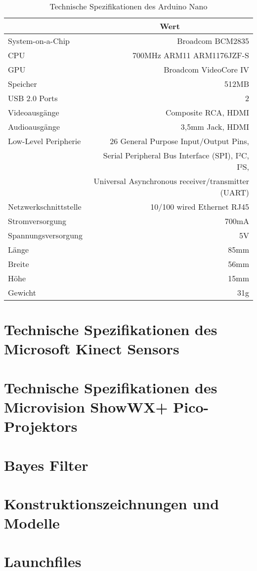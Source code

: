 \begin{table}[ht]
\caption{Technische Spezifikationen des Arduino Nano}
\begin{center}
\begin{tabular}{|l|r|}
\hline
\rowcolor{lightgray} \multicolumn{1}{|c|}{\textbf{Spezifikation}} & \multicolumn{1}{|c|}{\textbf{Wert}}\\
\hline
System-on-a-Chip & Broadcom BCM2835\\
\hline
CPU & 700MHz ARM11 ARM1176JZF-S\\
\hline
GPU & Broadcom VideoCore IV\\
\hline
Speicher & 512MB\\
\hline
USB 2.0 Ports & 2\\
\hline
Videoausgänge & Composite RCA, HDMI\\
\hline
Audioausgänge & 3,5mm Jack, HDMI\\
\hline
Low-Level Peripherie & 26 General Purpose Input/Output Pins,\\
& Serial Peripheral Bus Interface (SPI), I²C, I²S,\\
& Universal Asynchronous receiver/transmitter (UART)\\
\hline
Netzwerkschnittstelle & 10/100 wired Ethernet RJ45\\
\hline
Stromversorgung & 700mA\\
\hline
Spannungsversorgung & 5V\\
\hline
Länge & 85mm\\
\hline
Breite & 56mm\\
\hline
Höhe & 15mm\\
\hline
Gewicht & 31g\\
\hline
\end{tabular}
\end{center}
\label{tab:raspberry}
\end{table}

\clearpage{}

\section{Technische Spezifikationen des Microsoft Kinect Sensors}
\label{app:kinect}

\clearpage{}

\section{Technische Spezifikationen des Microvision ShowWX+ Pico-Projektors}
\label{app:projector}

\clearpage{}

\section{Bayes Filter}
\label{app:bayes}

\clearpage{}

\section{Konstruktionszeichnungen und Modelle}
\label{app:construction}

\clearpage{}

\section{Launchfiles}
\label{app:launchfiles}